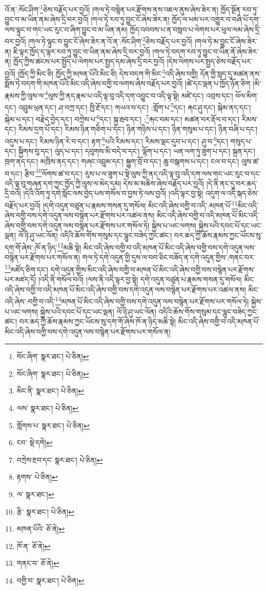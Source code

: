 འོ་ན་:སོང་ཤིག་\footnote{སོང་ཞིག་  སྣར་ཐང་།  པེ་ཅིན། }ཅེས་བརྗོད་པར་བྱའོ། །གལ་ཏེ་བསྙེན་པར་རྫོགས་ནས་འཇལ་ནུས་ཞེས་ཟེར་ན། ཁྱོད་སྔོན་རབ་ཏུ་བྱུང་བ་མ་ཡིན་ནམ་ཞེས་དྲི་བར་བྱའོ། །གལ་ཏེ་རབ་ཏུ་བྱུང་ངོ་ཞེས་ཟེར་ན། ཁྱོད་ལ་ཕམ་པར་འགྱུར་བ་བཞི་པོ་དག་ལས་ལྟུང་བ་གང་ཡང་རུང་བ་ཞིག་བྱུང་བ་མ་ཡིན་ནམ། ཁྱོད་འབབས་པ་ན་བསླབ་པ་ལེགས་པར་ཕུལ་ལམ་ཞེས་དྲི་བར་བྱའོ། །གལ་ཏེ་ལྟུང་བ་བྱུང་ངོ་ཞེས་ཟེར་ན་འོ་ན་:སོང་ཤིག་\footnote{སོང་ཞིག་  སྣར་ཐང་།  པེ་ཅིན། }ཅེས་བརྗོད་པར་བྱའོ། །གལ་ཏེ་མ་བྱུང་ངོ་ཞེས་ཟེར་ན། ཇི་ལྟར་ཁྱོད་ད་ལྟར་རབ་ཏུ་བྱུང་བ་ཡིན་ནམ་ཞེས་དྲི་བར་བྱའོ། །གལ་ཏེ་བདག་རབ་ཏུ་བྱུང་བ་ཡིན་ནོ་ཞེས་ཟེར་ན། ཁྱོད་ཀྱིས་ཚངས་པར་སྤྱོད་པ་ལེགས་པར་སྤྱད་དམ་ཞེས་དྲི་བར་བྱའོ། །དེས་ལེགས་པར་སྤྱད་ཅེས་བརྗོད་པར་བྱའོ། །ཁྱོད་ཀྱི་མིང་ཅི། ཁྱོད་ཀྱི་མཁན་པོའི་མིང་ཅི། དེས་བདག་གི་མིང་\footnote{མིང་ནི་  སྣར་ཐང་།  པེ་ཅིན། }འདི་ཞེས་བགྱི། དོན་གྱི་སླད་དུ་མཚན་ནས་སྨོས་ཏེ་བདག་གི་མཁན་པོའི་མིང་འདི་ཞེས་བགྱི་བ་ལགས་ཞེས་བརྗོད་པར་བྱའོ། །ཚེ་དང་ལྡན་པ་ཁྱོད་ཉོན་ཅིག །མི་རྣམས་ཀྱི་ལུས་ལ་\footnote{ལས་  སྣར་ཐང་།  པེ་ཅིན། }ལུས་ཀྱི་ནད་རྣམ་པ་འདི་ལྟ་བུ་འདི་དག་འབྱུང་བ་འདི་ལྟ་སྟེ། མཛེ་དང་། འབྲས་དང་། ཕོལ་མིག་དང་། འབྲུམ་ཕྲན་དང་། ཤ་བཀྲ་དང་། ཁྱི་རྔོ་དང་། གཡའ་བ་དང་། :གློག་པ་\footnote{གློགས་པ་  སྣར་ཐང་།  པེ་ཅིན། }དང་། རྐང་ཤུ་དང་། སྐེམ་ནད་དང་། སྐེམ་པ་དང་། བརྗེད་བྱེད་དང་། བཀྲེས་པ་\footnote{ངབ་  སྡེ་དགེ། }དང་། སྐྱ་རྦབ་དང་། :\footnote{བཀྲེས་རྔབ་དང་  སྣར་ཐང་།  པེ་ཅིན། }རྐང་བམ་དང་། མཚན་བར་རྡོལ་བ་དང་། རིམས་དང་། རིམས་དྲག་པོ་དང་། རིམས་ཉིན་གཅིག་པ་དང་། ཉིན་གཉིས་པ་དང་། ཉིན་གསུམ་པ་དང་། ཉིན་བཞི་པ་དང་། འདུས་པ་དང་། རིམས་ཉིན་རེ་བ་དང་། རྟག་\footnote{རྟགས་  པེ་ཅིན། }པའི་རིམས་དང་། རིམས་ལྡང་དུབ་པ་དང་། ཤུ་བ་\footnote{ལ་  སྣར་ཐང་། }དང་། གསུད་པ་དང་། སྐྱིགས་བུ་དང་། ལུད་པ་དང་། དབུགས་མི་བདེ་བ་དང་། ལྷོག་པ་དང་། ཡན་ལག་ཏུ་ཟུག་པ་དང་། སྐྲན་དང་། ཁྲག་ནད་དང་། མཁྲིས་ནད་དང་། གཞང་འབྲུམ་དང་། སྐྱུག་བྲོ་བ་དང་། ཆུ་བསྒགས་པ་དང་། ངལ་བ་དང་། ལུས་ཚ་བ་དང་། རྩིབ་\footnote{རྩི་  སྣར་ཐང་།  པེ་ཅིན། }ལོགས་ཚ་བ་དང་། རུས་པ་ལ་ཟུག་པ་སྟེ་ལུས་ཀྱི་ནད་འདི་ལྟ་བུ་འདི་དག་ལས་གང་ཡང་རུང་བ་དང་འདི་ལྟ་བུ་གཞན་དག་ཀྱང་ཁྱོད་ཀྱི་ལུས་ལ་མེད་དམ། དེས་མ་མཆིས་ཞེས་བརྗོད་པར་བྱའོ། །དེ་ནི་ནང་དུ་བར་ཆད་དྲི་བའོ། །དེའི་འོག་ཏུ་དགེ་སློང་ལས་བྱེད་པས་གསོལ་བ་བྱས་ཏེ་ལས་བྱའོ། །འདི་ལྟར་བྱ་སྟེ། འདུག་ལ་འདི་སྐད་ཅེས་བརྗོད་པར་བྱའོ། །དགེ་འདུན་བཙུན་པ་རྣམས་གསན་དུ་གསོལ། མིང་འདི་ཞེས་བགྱི་བ་འདི་:མཁན་པོ་\footnote{མཁན་པོའི་  ཅོ་ནེ། }མིང་འདི་ཞེས་བགྱི་བས་དགེ་འདུན་ལས་བསྙེན་པར་རྫོགས་པར་འཚལ་ནས། མིང་འདི་ཞེས་བགྱི་བ་འདི་མཁན་པོ་མིང་འདི་ཞེས་བགྱི་བས་དགེ་འདུན་ལས་བསྙེན་པར་རྫོགས་པར་གསོལ་ཏེ། སྐྱེས་པ་ཡང་ལགས། སྐྱེས་པའི་དབང་པོ་དང་ཡང་ལྡན། ལོ་ཉི་ཤུ་ཡང་ལོན། འདིའི་ཆོས་གོས་གསུམ་དང་ལྷུང་བཟེད་ཀྱང་ཚང་། བར་ཆད་ཀྱི་ཆོས་རྣམས་ཀྱང་ཡོངས་སུ་དག་གོ་ཞེས་:ཁོ་ན་ཉིད་\footnote{ཁོ་ན་  ཅོ་ནེ། }མཆི་སྟེ། མིང་འདི་ཞེས་བགྱི་བ་འདི་མཁན་པོ་མིང་འདི་ཞེས་བགྱི་བས་དགེ་འདུན་ལས་བསྙེན་པར་རྫོགས་པར་གསོལ་ན། གལ་ཏེ་དགེ་འདུན་གྱི་དུས་ལ་བབ་ཅིང་བཟོད་ན་དགེ་འདུན་གྱིས་:གནང་བར་\footnote{གནང་བ་  ཅོ་ནེ། }མཛོད་ཅིག་དང་། དགེ་འདུན་གྱིས་མིང་འདི་ཞེས་བགྱི་བ་མཁན་པོ་མིང་འདི་ཞེས་བགྱི་བས་བསྙེན་པར་རྫོགས་པར་མཛད་དོ། །འདི་ནི་གསོལ་བའོ། །ལས་ནི་འདི་ལྟར་བྱ་སྟེ། དགེ་འདུན་བཙུན་པ་རྣམས་གསན་དུ་གསོལ། མིང་འདི་ཞེས་བགྱི་བ་འདི་མཁན་པོ་མིང་འདི་ཞེས་བགྱི་བས་དགེ་འདུན་ལས་བསྙེན་པར་རྫོགས་པར་འཚལ་ནས། མིང་འདི་ཞེས་:བགྱི་བ་འདི་\footnote{བགྱི་བ་  སྣར་ཐང་།  པེ་ཅིན། }མཁན་པོ་མིང་འདི་ཞེས་བགྱི་བས་དགེ་འདུན་ལས་བསྙེན་པར་རྫོགས་པར་གསོལ་ཏེ། སྐྱེས་པ་ཡང་ལགས། སྐྱེས་པའི་དབང་པོ་དང་ཡང་ལྡན། ལོ་ཉི་ཤུ་ཡང་ལོན། འདིའི་ཆོས་གོས་གསུམ་དང་ལྷུང་བཟེད་ཀྱང་ཚང་། བར་ཆད་ཀྱི་ཆོས་རྣམས་ཀྱང་ཡོངས་སུ་དག་གོ་ཞེས་ཁོ་ན་ཉིད་མཆི་སྟེ། མིང་འདི་ཞེས་བགྱི་བ་འདི་མཁན་པོ་མིང་འདི་ཞེས་བགྱི་བས་དགེ་འདུན་ལས་བསྙེན་པར་རྫོགས་པར་གསོལ་ན། 